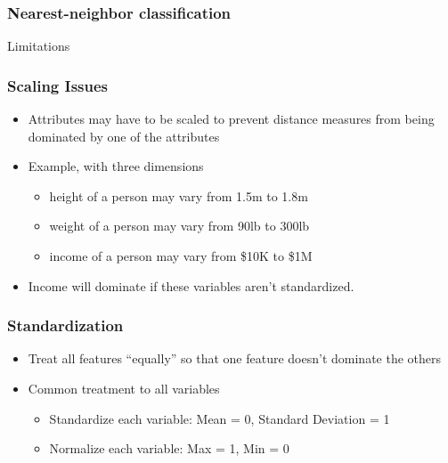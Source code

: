 \begin{frame}[fragile]\frametitle{Nearest-neighbor classification }
Limitations

\hfill
{}
\end{frame}

\begin{frame}[fragile]\frametitle{Scaling Issues}
\begin{itemize}
\item Attributes may have to be scaled to prevent distance measures from being dominated by one of the attributes
\item Example, with three dimensions
\begin{itemize}
\item  height of a person may vary from 1.5m to 1.8m
\item   weight of a person may vary from 90lb to 300lb
\item   income of a person may vary from \$10K to \$1M
\end{itemize}
\item Income will dominate if these variables aren't standardized.
\end{itemize}
\end{frame}

\begin{frame}[fragile]\frametitle{Standardization}
\begin{itemize}
\item Treat all features ``equally'' so that one feature doesn't dominate the others
\item Common treatment to all variables
\begin{itemize}
\item  Standardize each variable: Mean = 0, Standard Deviation = 1
\item Normalize each variable: Max = 1, Min = 0
\end{itemize}
\end{itemize}
\end{frame}

